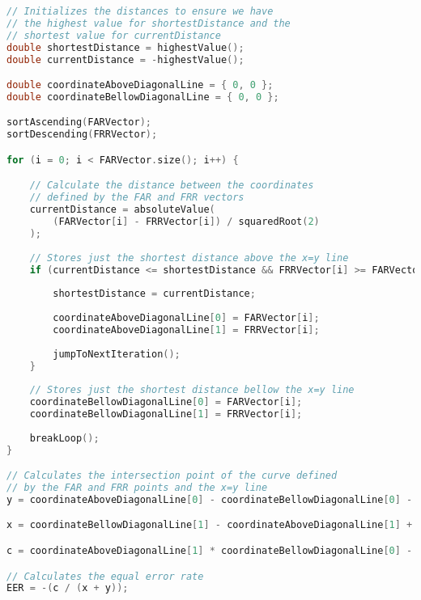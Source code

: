 \begin{lstlisting}[language=C++, caption={EER algorithm}, label={lst:EERAlgo}]
// Initializes the distances to ensure we have
// the highest value for shortestDistance and the
// shortest value for currentDistance
double shortestDistance = highestValue();
double currentDistance = -highestValue();

double coordinateAboveDiagonalLine = { 0, 0 };
double coordinateBellowDiagonalLine = { 0, 0 };

sortAscending(FARVector);
sortDescending(FRRVector);

for (i = 0; i < FARVector.size(); i++) {

	// Calculate the distance between the coordinates
	// defined by the FAR and FRR vectors
	currentDistance = absoluteValue(
		(FARVector[i] - FRRVector[i]) / squaredRoot(2)
	);
	
	// Stores just the shortest distance above the x=y line
	if (currentDistance <= shortestDistance && FRRVector[i] >= FARVector[i]) {
	
		shortestDistance = currentDistance;
	
		coordinateAboveDiagonalLine[0] = FARVector[i];
		coordinateAboveDiagonalLine[1] = FRRVector[i];
	
		jumpToNextIteration();
	}
	
	// Stores just the shortest distance bellow the x=y line
	coordinateBellowDiagonalLine[0] = FARVector[i];
	coordinateBellowDiagonalLine[1] = FRRVector[i];
	
	breakLoop();
}

// Calculates the intersection point of the curve defined
// by the FAR and FRR points and the x=y line
y = coordinateAboveDiagonalLine[0] - coordinateBellowDiagonalLine[0] - 1;

x = coordinateBellowDiagonalLine[1] - coordinateAboveDiagonalLine[1] + 1;

c = coordinateAboveDiagonalLine[1] * coordinateBellowDiagonalLine[0] - coordinateAboveDiagonalLine[0] * coordinateBellowDiagonalLine[1];

// Calculates the equal error rate
EER = -(c / (x + y));
\end{lstlisting}